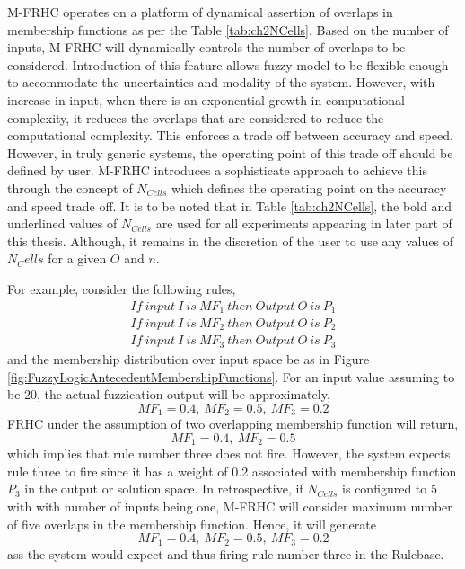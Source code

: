 M-FRHC operates on a platform of dynamical assertion of overlaps in membership functions as per the Table \ref{tab:ch2NCells}. Based on the number of inputs, M-FRHC will dynamically controls the number of overlaps to be considered. Introduction of this feature allows fuzzy model to be flexible enough to accommodate the uncertainties and modality of the system. However, with increase in input, when there is an exponential growth in computational complexity, it reduces the overlaps that are considered to reduce the computational complexity. This enforces a trade off between accuracy and speed. However, in truly generic systems, the operating point of this trade off should be defined by user. M-FRHC introduces a sophisticate approach to achieve this through the concept of $N_{Cells}$ which defines the operating point on the accuracy and speed trade off. It is to be noted that in Table \ref{tab:ch2NCells}, the bold and underlined values of $N_{Cells}$ are used for all experiments appearing in later part of this thesis. Although, it remains in the discretion of the user to use any values of $ N_Cells $ for a given $ O $ and $ n $. 

For example, consider the following rules,
\[\begin{array}{l}
If~input~I~is~M{F_1}~then~Output~O~is~{P_1}\\
If~input~I~is~M{F_2}~then~Output~O~is~{P_2}\\
If~input~I~is~M{F_3}~then~Output~O~is~{P_3}
\end{array}\]
and the membership distribution over input space be as in Figure \ref{fig:FuzzyLogicAntecedentMembershipFunctions}. For an input value assuming to be 20, the actual fuzzication output will be approximately,
\[M{F_1} = 0.4,~M{F_2} = 0.5,~M{F_3} = 0.2\]
FRHC under the assumption of two overlapping membership function will return,
\[M{F_1} = 0.4,~M{F_2} = 0.5\] 
which implies that rule number three does not fire. However, the system expects rule three to fire since it has a weight of 0.2 associated with membership function $P_3$ in the output or solution space. In retrospective, if $N_{Cells}$ is configured to 5 with with number of inputs being one, M-FRHC will consider maximum number of five overlaps in the membership function. Hence, it will generate 
\[M{F_1} = 0.4,~M{F_2} = 0.5,~M{F_3} = 0.2\]
ass the system would expect and thus firing rule number three in the Rulebase.

